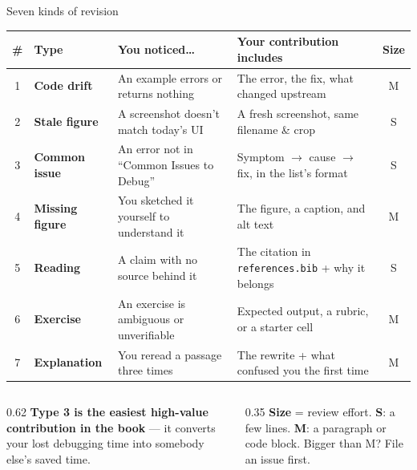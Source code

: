 \documentclass[9pt,aspectratio=169]{beamer}
\begin{document}
\begin{frame}{Seven kinds of revision}
    \begin{table}
    \centering
    \scriptsize
    \begin{tabular}{clll c}
        \toprule
        \textbf{\#} & \textbf{Type} & \textbf{You noticed\ldots} & \textbf{Your contribution includes} & \textbf{Size} \\ \midrule
        1 & \textcolor{tab-red}{\textbf{Code drift}} & An example errors or returns nothing & The error, the fix, what changed upstream & M \\
        2 & \textcolor{tab-red}{\textbf{Stale figure}} & A screenshot doesn't match today's UI & A fresh screenshot, same filename \& crop & S \\
        3 & \textcolor{tab-blue}{\textbf{Common issue}} & An error not in ``Common Issues to Debug'' & Symptom $\rightarrow$ cause $\rightarrow$ fix, in the list's format & S \\
        4 & \textcolor{tab-blue}{\textbf{Missing figure}} & You sketched it yourself to understand it & The figure, a caption, and alt text & M \\
        5 & \textcolor{tab-blue}{\textbf{Reading}} & A claim with no source behind it & The citation in \texttt{references.bib} + why it belongs & S \\
        6 & \textcolor{tab-orange}{\textbf{Exercise}} & An exercise is ambiguous or unverifiable & Expected output, a rubric, or a starter cell & M \\
        7 & \textcolor{tab-orange}{\textbf{Explanation}} & You reread a passage three times & The rewrite + what confused you the first time & M \\
        \bottomrule
    \end{tabular}
    \end{table}

    \vspace{0.3em}

    \begin{columns}[T]
        \begin{column}{0.62\textwidth}
            {\footnotesize \textbf{Type 3 is the easiest high-value contribution in the book} --- it converts your lost debugging time into somebody else's saved time.}
        \end{column}
        \begin{column}{0.35\textwidth}
            {\footnotesize \textbf{Size} = review effort. \textbf{S}: a few lines. \textbf{M}: a paragraph or code block. Bigger than M? File an issue first.}
        \end{column}
    \end{columns}
\end{frame}
\end{document}
